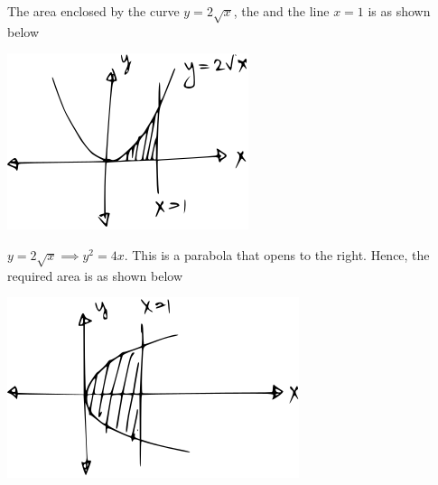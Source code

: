 \documentclass[14pt,fleqn]{extarticle}
\begin{document}
\begin{snippet}
    
    \incorrect
    
    The area enclosed by the curve $y=2\sqrt{x}$, the \xaxis and the line $x=1$ is as shown below 
    
    \begin{center}
\includegraphics[scale=1.4]{wrong.svg}
\end{center} 
    
    \reason
    
    $y=2\sqrt{x}\implies y^2 = 4x$. This is a parabola that opens to the right.
    Hence, the required area is as shown below 
    
    \begin{center}
\includegraphics[scale=1.4]{right.svg}
\end{center}
\end{snippet} 
\end{document}
